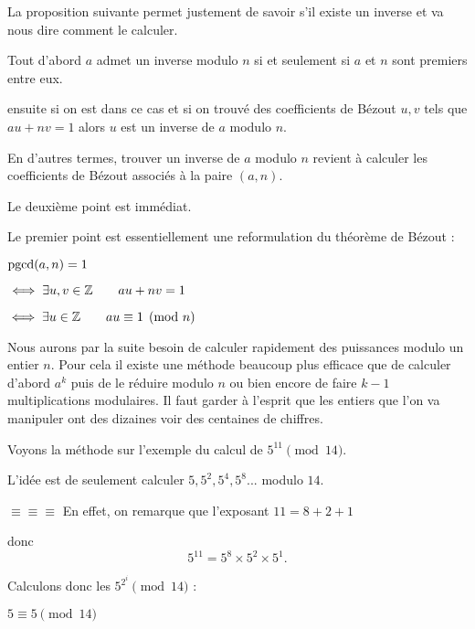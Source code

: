 \change
La proposition suivante permet justement de savoir s'il existe un inverse et va nous dire comment le calculer.

Tout d'abord 
$a$ admet un inverse modulo $n$ si et seulement si $a$ et $n$ sont premiers entre eux.


\change
ensuite si on est dans ce cas 
et si on trouvé des coefficients de Bézout $u,v$ tels que 
$au+nv=1$ alors $u$ est un inverse de $a$ modulo $n$.



En d'autres termes, trouver un inverse de $a$ modulo $n$ revient à calculer les coefficients de Bézout
associés à la paire $(a,n)$.

\change

Le deuxième point est immédiat.

Le premier point est essentiellement une reformulation du théorème de Bézout :

$\mathop{\mathrm{pgcd}}\nolimits(a,n)=1$

\change

$\iff  \exists u,v \in \mathbb{Z} \qquad au+nv=1$

\change
$\iff  \exists u \in \mathbb{Z} \qquad au \equiv 1 \pmod {n}$


% 
% 
% 
% 
% 
% 



\diapo

Nous aurons par la suite besoin de calculer rapidement des puissances modulo un entier $n$.
Pour cela il existe une méthode beaucoup plus efficace que de calculer d'abord 
$a^k$ puis de le réduire modulo $n$ ou bien encore de faire $k-1$ multiplications modulaires. 
Il faut garder à l'esprit que les entiers
que l'on va mani\-puler ont des dizaines voir des centaines de chiffres.


\change
Voyons la méthode sur l'exemple du calcul de $5^{11} \pmod{14}$.


L'idée est de seulement calculer $5, 5^2, 5^4, 5^8...$ %
modulo $14$.


\change
$\equiv \equiv \equiv $
En effet, on remarque que l'exposant $11 = 8 + 2 + 1$

\change
donc
$$5 ^{11} = 5^8 \times 5^2 \times 5^1.$$

\change
Calculons donc les $5^{2^i} \pmod {14}$ :

\change
$5  \equiv  5 \pmod{14}$

